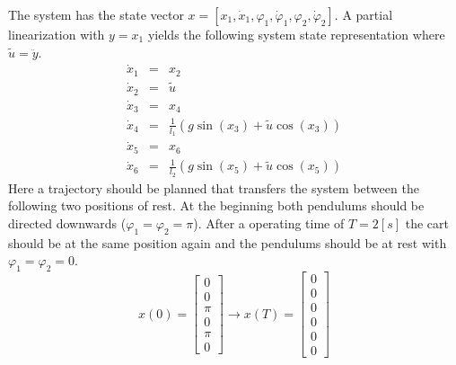 \documentclass[letterpaper,10pt,english]{sphinxmanual}
\begin{document}
The system has the state vector \(x = [x_1, \dot{x}_1,
\varphi_1, \dot{\varphi}_1, \varphi_2, \dot{\varphi}_2]\). A partial
linearization with \(y = x_1\) yields the following system state
representation where \(\tilde{u} = \ddot{y}\).
\begin{eqnarray*}
   \dot{x}_1 & = & x_2 \\
   \dot{x}_2 & = & \tilde{u} \\
   \dot{x}_3 & = & x_4 \\
   \dot{x}_4 & = & \frac{1}{l_1}(g \sin(x_3) + \tilde{u} \cos(x_3)) \\
   \dot{x}_5 & = & x_6 \\
   \dot{x}_6 & = & \frac{1}{l_2}(g \sin(x_5) + \tilde{u} \cos(x_5))
\end{eqnarray*}
Here a trajectory should be planned that transfers the system between
the following two positions of rest. At the beginning both pendulums
should be directed downwards (\(\varphi_1 = \varphi_2 = \pi\)).
After a operating time of \(T = 2 [s]\) the cart should be at the
same position again and the pendulums should be at rest with
\(\varphi_1 = \varphi_2 = 0\).
\begin{equation*}
   x(0) = \begin{bmatrix} 0 \\ 0 \\ \pi \\ 0 \\ \pi \\ 0 \end{bmatrix}
   \rightarrow
   x(T) = \begin{bmatrix} 0 \\ 0 \\ 0 \\ 0 \\ 0 \\ 0 \end{bmatrix}
\end{equation*}
\end{document}
